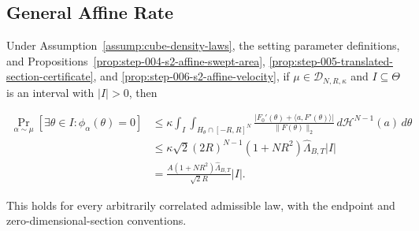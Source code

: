 \subsection{General Affine Rate}\label{app:step-007}

\begin{lemma}
\label{lem:step-007-s2-fixed-law-rate}
Under Assumption~\ref{assump:cube-density-laws}, the setting parameter definitions, and Propositions~\ref{prop:step-004-s2-affine-swept-area},
\ref{prop:step-005-translated-section-certificate}, and
\ref{prop:step-006-s2-affine-velocity}, if
\(\mu\in\mathcal D_{N,R,\kappa}\) and \(I\subseteq\Theta\) is an interval with
\(\lvert I\rvert>0\), then

\begin{equation}
\begin{aligned}
\Pr_{\alpha\sim\mu}[\exists\theta\in I:\phi_\alpha(\theta)=0]
&\leq
\kappa\int_I\int_{H_\theta\cap[-R,R]^N}
\frac{\lvert F_0'(\theta)+\langle a,F'(\theta)\rangle\rvert}
{\lVert F(\theta)\rVert_2}
\,d\mathcal H^{N-1}(a)\,d\theta\\
&\leq
\kappa\sqrt2(2R)^{N-1}(1+NR^2)
\widehat\Lambda_{B,T}\lvert I\rvert\\
&=
\frac{A(1+NR^2)\widehat\Lambda_{B,T}}{\sqrt2R}
\lvert I\rvert.
\end{aligned}
\label{eq:step-007-rate-chain}
\end{equation}

This holds for every arbitrarily correlated admissible law, with the endpoint and
zero-dimensional-section conventions.


\end{lemma}

